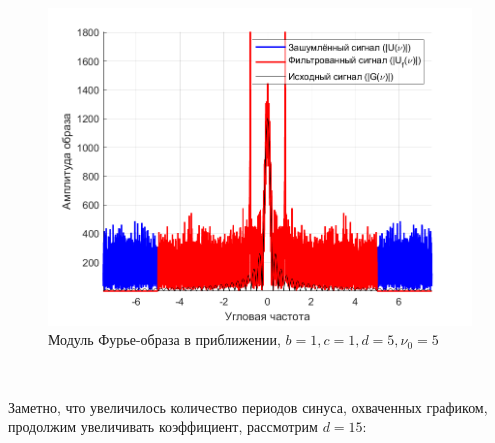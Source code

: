 \documentclass[a4paper]{article}
\begin{document}
\begin{figure}[H]
    \centering
    \includegraphics[width=0.5\linewidth]{part2/1_1_5_Fourier_scaled.png}
    \caption{Модуль Фурье-образа в приближении, $b = 1, c = 1, d = 5, \nu_0 = 5$}
\end{figure}\

Заметно, что увеличилось количество периодов синуса, охваченных графиком, продолжим увеличивать коэффициент, рассмотрим $d = 15$:
\end{document}
